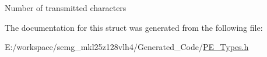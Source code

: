 Number of transmitted characters 

The documentation for this struct was generated from the following file\-:\begin{DoxyCompactItemize}
\item 
E\-:/workspace/semg\-\_\-mkl25z128vlh4/\-Generated\-\_\-\-Code/\hyperlink{_p_e___types_8h}{P\-E\-\_\-\-Types.\-h}\end{DoxyCompactItemize}
